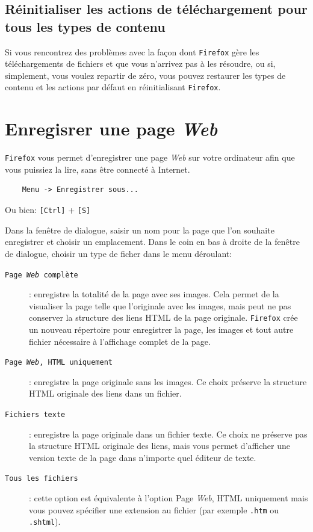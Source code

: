\documentclass[a4paper,11pt]{book}
\begin{document}
\subsection*{Réinitialiser les actions de téléchargement pour tous les types de contenu}
Si vous rencontrez des problèmes avec la façon dont \texttt{Firefox} gère les téléchargements de fichiers et que vous n’arrivez pas à les résoudre, ou si, simplement, vous voulez repartir de zéro, vous pouvez restaurer les types de contenu et les actions par défaut en réinitialisant \texttt{Firefox}.
\medskip

\section{Enregisrer une page \textit{Web}}
\texttt{Firefox} vous permet d'enregistrer une page \textit{Web} sur votre ordinateur afin que vous puissiez la lire, sans être connecté à Internet.
\begin{verbatim}
    Menu -> Enregistrer sous...
\end{verbatim}
\medskip

Ou bien: \texttt{[Ctrl]} + \texttt{[S]}
\medskip

Dans la fenêtre de dialogue, saisir un nom pour la page que l'on souhaite enregistrer et choisir un emplacement. Dans le coin en bas à droite de la fenêtre de dialogue, choisir un type de ficher dans le menu déroulant:
\begin{description}
	\item[\texttt{Page \textit{Web} complète}]: enregistre la totalité de la page avec ses images. Cela permet de la visualiser la page telle que l'originale avec les images, mais peut ne pas conserver la structure des liens HTML de la page originale. \texttt{Firefox} crée un nouveau répertoire pour enregistrer la page, les images et tout autre fichier nécessaire à l'affichage complet de la page.
	\item[\texttt{Page \textit{Web}, HTML uniquement}]: enregistre la page originale sans les images. Ce choix préserve la structure HTML originale des liens dans un fichier.
	\item[\texttt{Fichiers texte}]: enregistre la page originale dans un fichier texte. Ce choix ne préserve pas la structure HTML originale des liens, mais vous permet d'afficher une version texte de la page dans n'importe quel éditeur de texte. 
	\item[\texttt{Tous les fichiers}]: cette option est équivalente à l'option \og Page \textit{Web}, HTML uniquement\fg{} mais vous pouvez spécifier une extension au fichier (par exemple \texttt{.htm} ou \texttt{.shtml}). 
\end{description}
\medskip
\end{document}
